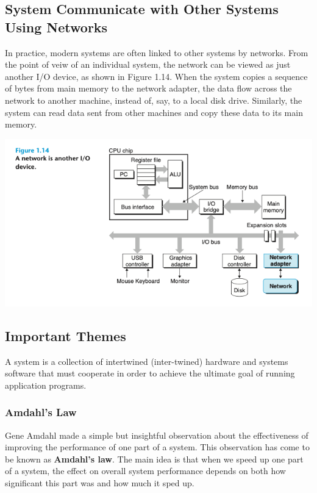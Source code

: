 \documentclass[11pt]{article}
\begin{document}
\subsection{System Communicate with Other Systems Using Networks}
\label{sec:orgf460a3a}
In practice, modern systems are often linked to other systems by networks. From the point of veiw of an individual system, the network can be viewed as just another I/O device, as shown in Figure 1.14. When the system copies a sequence of bytes from main memory to the network adapter, the data flow across the network to another machine, instead of, say, to a local disk drive. Similarly, the system can read data sent from other machines and copy these data to its main memory.\\

\begin{center}
\includegraphics[width=.9\linewidth]{pics/a-network-is-another-io-device.png}
\end{center}

\subsection{Important Themes}
\label{sec:orgc00d348}
A system is a collection of intertwined (inter-twined) hardware and systems software that must cooperate in order to achieve the ultimate goal of running application programs.\\

\subsubsection{Amdahl's Law}
\label{sec:org7ab7a7f}
Gene Amdahl made a simple but insightful observation about the effectiveness of improving the performance of one part of a system. This observation has come to be known as \textbf{Amdahl's law}. The main idea is that when we speed up one part of a system, the effect on overall system performance depends on both how significant this part was and how much it sped up.\\
\end{document}
